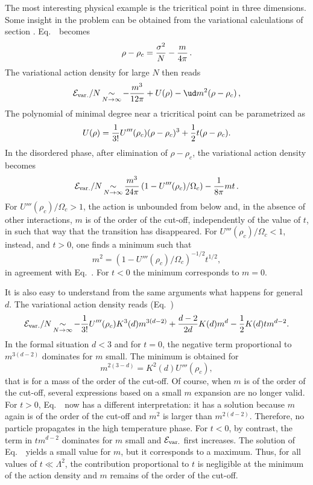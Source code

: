 The most interesting physical example is the tricritical point in
three dimensions. Some insight in the problem can be obtained from
the variational calculations of section \ssNVarfiv.
Eq.~\esaddleNcii\ becomes\sslbl\ssNtricritical
$$\rho -\rho _c={\sigma ^2 \over N} -{m \over 4\pi}\,.$$
The variational action density for large $N$ then reads
$${\cal E}_{\rm var.}/N\mathop{\sim}_{N\to \infty }    -{m^3\over 12\pi}+
 U(\rho)-\ud m^2 (\rho-\rho _c) \,,$$
The polynomial of minimal degree near a tricritical point can be parametrized as
$$U(\rho)={1\over3!}U'''(\rho _c) (\rho-\rho _c)^3+{1\over2}t (\rho-\rho _c).$$
In the disordered phase, after elimination of $\rho -\rho _c$,
the variational action density becomes
$$ {\cal E}_{\rm var.}/N\mathop{\sim}_{N\to \infty } {m^3\over24\pi}\left(1-
  U'''(\rho _c)/ \Omega _c\right) -{1\over8\pi}m t \,.$$
For $U'''(\rho _c)/ \Omega _c>1$,  the action is unbounded from below
and, in the absence of other interactions, $m$ is of the order of the cut-off,
independently of the value of $t$, in such that way that the transition has disappeared.  For $U'''(\rho _c)/ \Omega _c<1$, instead, and $t>0$, one finds a minimum such that
$$m^2=\left(1-  U'''(\rho _c)/ \Omega _c\right)^{-1/2} t^{1/2},$$
in agreement with Eq.~\emsq. For $t<0$ the minimum corresponds to $m=0$.
\par
It is also easy to understand from the same arguments what happens for general $d$. The variational action density reads (Eq.~\edmum)
$$ {\cal E}_{\rm var.}/N\mathop{\sim}_{N\to \infty } -{1\over3!}U'''(\rho _c) K^3(d)
m^{3(d-2)}+{d-2\over 2d} K(d)m^{d}-{1\over2}K(d)t m^{d-2}.$$
In the formal situation $d<3$ and for $t=0$, the negative term proportional to $m^{3(d-2)}$ dominates for $m$ small. The minimum is obtained for
$$m^{2(3-d)}=K^2(d)  U'''(\rho _c),$$
that is for a mass of the order of the cut-off. Of course, when $m$ is of the order
of the cut-off, several expressions based on a small $m$ expansion are no longer valid.
For $t>0$, Eq.~\emsq\ now has a different interpretation: it has a solution because $m$ again is of the order
of the cut-off and  $m^2$ is larger than $m^{2(d-2)}$. Therefore, no particle propagates in the high temperature phase. For $t<0$, by contrast, the term in $tm^{d-2}$ dominates for $m$ small
and ${\cal E}_{\rm var.}$ first increases. The solution of Eq.~\emsq\ yields a
small value for $m$, but it corresponds to a maximum. Thus, for all values of
$t\ll \Lambda ^2$, the contribution proportional to $t$ is negligible at the
minimum of the action density and $m$ remains of the order of the cut-off.
